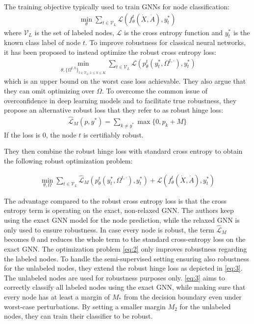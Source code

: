 \documentclass[a4paper,preprint]{sig-alternate}
\begin{document}
The training objective typically used to train GNNs for node classification:
\begin{gather}
    \min_{\theta} \sum_{t \in \mathcal{V}_L} \mathcal{L} (f_{\theta}^t (\dot{X}, \dot{A}), y_t^{\ast})
\end{gather}
where $\mathcal{V}_L$ is the set of labeled nodes, $\mathcal{L}$ is the
cross entropy function and $y_t^{\ast}$ is the known class label of node $t$.
To improve robustness for classical neural networks, it has been proposed to instead optimize the robust cross entropy loss:
\begin{gather}
    \min_{\theta, \{\Omega^{t, k}\}_{t \in \mathcal{V}_L, 1 \leq k \leq K}} \sum_{t \in \mathcal{V}_L} \mathcal{L} (p_{\theta}^t (y_t^{\ast}, \Omega^{t, \cdot}), y_t^{\ast})
\end{gather}
which is an upper bound on the worst case loss achievable. They also argue that they can omit optimizing over $\Omega$.
To overcome the common issue of overconfidence in deep learning models and to facilitate true robustness, they propose an alternative
robust loss that they refer to as robust hinge loss:
\begin{gather}
    \mathcal{\hat{L}}_M (p, y^{\ast}) = \sum_{k \neq y^{\ast}} \max \{0, p_k + M\}
\end{gather}
If the loss is $0$, the node $t$ is certifiably robust.

\vfill
\pagebreak

They then combine the robust hinge loss with standard cross entropy to obtain the following robust optimization problem:

\begin{gather}
\label{eq:2}
    \min_{\theta, \Omega} \sum_{t \in \mathcal{V}_L} \mathcal{\hat{L}}_M (p_{\theta}^t (y_t^{\ast}, \Omega^{t, \cdot}), y_t^{\ast}) + \mathcal{L} (f_{\theta}^t (\dot{X}, \dot{A}), y_t^{\ast})
\end{gather}

The advantage compared to the robust cross entropy loss is that the cross entropy term is operating on the exact, non-relaxed GNN.
The authors keep using the exact GNN model for the node prediction, while the relaxed GNN is only used to ensure robustness. 
In case every node is robust, the term $\mathcal{\hat{L}}_M$ becomes $0$ and reduces the whole term to the standard cross-entropy loss 
on the exact GNN.\newline
The optimization problem \ref{eq:2} only improves robustness regarding the labeled nodes.
To handle the semi-supervised setting ensuring also robustness for the unlabeled nodes, they extend the robust hinge loss
as depicted in \ref{eq:3}. The unlabeled nodes are used for robustness purposes only. \ref{eq:3} aims to correctly classify all labeled 
nodes using the exact GNN, while making sure that every node has at least a margin of $M_{\ast}$ from the decision boundary even under
worst-case perturbations. By setting a smaller margin $M_2$ for the unlabeled nodes, they can train their classifier to be robust.
\end{document}

